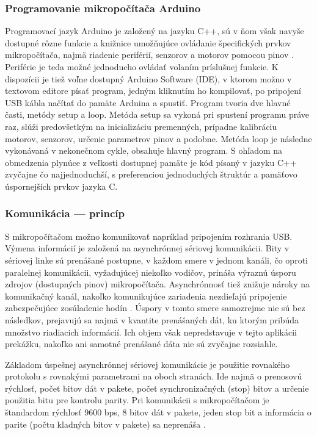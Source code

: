 \subsubsection{Programovanie mikropočítača Arduino}
Programovací jazyk Arduino je založený na jazyku C++, sú v ňom však navyše dostupné rôzne funkcie a knižnice umožňujúce ovládanie špecifických prvkov mikropočítača, najmä riadenie periférií, senzorov a motorov pomocou pinov \cite{ArduinoLanguage}. Periférie je teda možné jednoducho ovládať volaním príslušnej funkcie. K dispozícii je tiež voľne dostupný Arduino Software (IDE), v ktorom možno v textovom editore písať program, jedným kliknutím ho kompilovať, po pripojení USB kábla načítať do pamäte Arduina a spustiť. Program tvoria dve hlavné časti, metódy setup a loop. Metóda setup sa vykoná pri spustení programu práve raz, slúži predovšetkým na inicializáciu premenných, prípadne kalibráciu motorov, senzorov, určenie parametrov pinov a podobne. Metóda loop je následne vykonávaná v nekonečnom cykle, obsahuje hlavný program. S ohľadom na obmedzenia plynúce z veľkosti dostupnej pamäte je kód písaný v jazyku C++ zvyčajne čo najjednoduchší, s preferenciou jednoduchých štruktúr a pamäťovo úspornejších prvkov jazyka C.

\subsubsection{Komunikácia --- princíp}
S mikropočítačom možno komunikovať napríklad pripojením rozhrania USB. Výmena informácií je založená na asynchrónnej sériovej komunikácii. Bity v sériovej linke sú prenášané postupne, v každom smere v jednom kanáli, čo oproti paralelnej komunikácii, vyžadujúcej niekoľko vodičov, prináša výraznú úsporu zdrojov (dostupných pinov) mikropočítača. Asynchrónnosť tiež znižuje nároky na komunikačný kanál, nakoľko komunikujúce zariadenia nezdieľajú pripojenie zabezpečujúce zosúladenie hodín \cite{serialCommunication}. Úspory v tomto smere samozrejme nie sú bez následkov, prejavujú sa najmä v kvantite prenášaných dát, ku ktorým pribúda množstvo riadiacich informácií. Ich objem však nepredstavuje v tejto aplikácii prekážku, nakoľko ani samotné prenášané dáta nie sú zvyčajne rozsiahle.

Základom úspešnej asynchrónnej sériovej komunikácie je použitie rovnakého protokolu s rovnakými parametrami na oboch stranách. Ide najmä o prenosovú rýchlosť, počet bitov dát v pakete, počet synchronizačných (stop) bitov a určenie použitia bitu pre kontrolu parity. Pri komunikácii s mikropočítačom je štandardom rýchlosť 9600 bps, 8 bitov dát v pakete, jeden stop bit a informácia o parite (počtu kladných bitov v pakete) sa neprenáša \cite{serialCommunicationParameters}.

